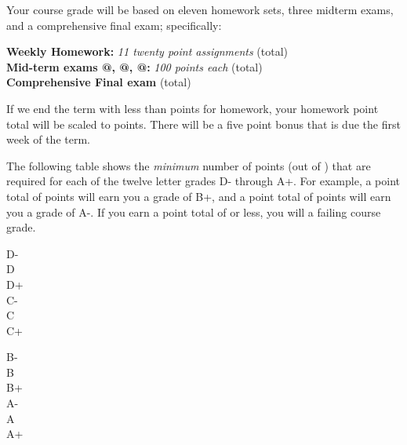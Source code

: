 \documentclass[12pt]{article}
\makeatletter
\newcounter{hw}\setcounter{hw}{0}
\newcommand*{\rom}[1]{\expandafter\@slowromancap\romannumeral #1@}
\newcounter{ex}\setcounter{ex}{0}
\newenvironment{mypar}[2]
  {\begin{list}{}%
    {\setlength\leftmargin{#1}
    \setlength\rightmargin{#2}}
    \item[]}
  {\end{list}}
\makeatother
\begin{document}
Your course grade will be based on eleven homework sets, three midterm exams, and a comprehensive 
final exam; specifically:
\begin{mypar}{0.25in}{0.25in}
    \textbf{Weekly Homework:}  \emph{11 twenty point assignments}  \dotfill \hwpts\/ (total) \\
    \textbf{Mid-term exams \rom{1}, \rom{2}, \rom{3}:} \emph{100 points each}  (total)\\
    \textbf{Comprehensive Final exam}  (total)
\end{mypar}
If we end the term with less than \hwpts\/ points for homework,  
your homework point total will be scaled to \hwpts\/ points. 
There will be a five point bonus that is due the first week of the 
term.






The following table shows the \emph{minimum} number of points (out of \points) that
are required for each of the twelve letter grades D- through A+. For
example, a point total of \Bp\/  points will earn you a grade of B+,  and 
a point total of \Am\/ points will earn you a grade of A-. If you earn a point
total of \F\/  or less, you will a failing course grade.
  \begin{center}
     \begin{minipage}{5.5in}
\begin{mypar}{0.25in}{0.25in}
    \begin{minipage}{2.5in}
        D-  \dotfill \Dm \\
        D \dotfill \D \\
        D+ \dotfill \Dp \\
        C- \dotfill \Cm  \\
        C \dotfill \C \\
        C+ \dotfill \Cp 
        \end{minipage}
    \phantom{xxxxx}
    \begin{minipage}{2.5in}
        B- \dotfill \Bm \\
        B \dotfill  \B \\
        B+ \dotfill  \Bp\\
        A- \dotfill  \Am \\
        A \dotfill  \A \\
        A+ \dotfill  \Ap
    \end{minipage}
\end{mypar} 
\end{minipage}
\end{center}
\end{document}
